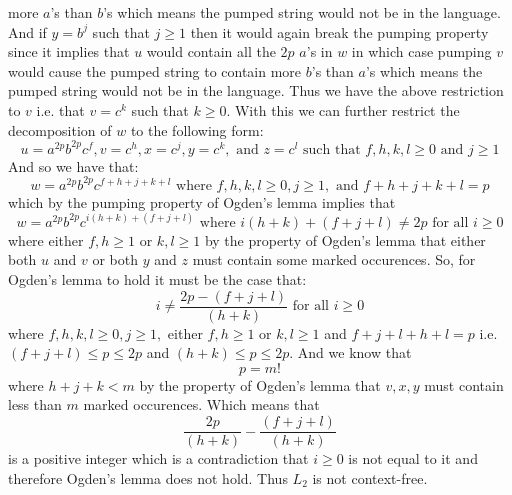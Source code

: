 \documentclass[12pt]{article}
\begin{document}
more $a$'s than $b$'s which means the pumped string would not be in the language.
And if $y=b^j$ such that $j\ge 1$ then it would again break the pumping property
since it implies that $u$ would contain all the $2p$ $a$'s in $w$ in which case
pumping $v$ would cause the pumped string to contain more $b$'s than $a$'s which
means the pumped string would not be in the language. Thus we have the above
restriction to $v$ i.e. that $v=c^k$ such that $k\ge 0$. With this we can
further restrict the decomposition of $w$ to the following form:
$$u=a^{2p}b^{2p}c^f, v=c^h, x=c^j, y=c^k,\text{ and } z=c^l
\text{ such that } f,h,k,l\ge 0 \text{ and } j\ge1$$
And so we have that:
$$w = a^{2p}b^{2p}c^{f+h+j+k+l} \text{ where } f,h,k,l\ge 0, j\ge 1,
\text{ and } f+h+j+k+l=p$$
which by the pumping property of Ogden's lemma implies that
$$w = a^{2p}b^{2p}c^{i(h+k) + (f+j+l)} \text { where } i(h+k)+(f+j+l)\neq 2p
\text{ for all } i\ge 0$$
where either $f,h\ge 1$ or $k,l\ge 1$ by the property of Ogden's lemma that
either both $u$ and $v$ or both $y$ and $z$ must contain some marked occurences.
So, for Ogden's lemma to hold it must be the case that:
$$i \neq \frac{2p-(f+j+l)}{(h+k)} \text{ for all } i\ge 0$$
where $f,h,k,l \ge 0, j\ge 1,$ either $f,h\ge 1$ or $k,l\ge 1$ and
$f+j+l+h+l = p$ i.e. $(f+j+l) \le p \le 2p$ and $(h+k) \le p \le 2p$. And we
know that
$$p = m!$$
where $h+j+k < m$ by the property of Ogden's lemma that $v,x,y$ must contain
less than $m$ marked occurences. Which means that
$$\frac{2p}{(h+k)}-\frac{(f+j+l)}{(h+k)}$$
is a positive integer which is a contradiction that $i\ge 0$ is not equal to
it and therefore Ogden's lemma does not hold. Thus $L_2$ is not context-free.
\end{document}
